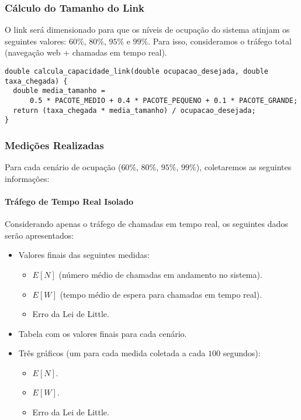 \subsubsection{Cálculo do Tamanho do Link}
O link será dimensionado para que os níveis de ocupação do sistema atinjam os seguintes valores: \(60\%\), \(80\%\), \(95\%\) e \(99\%\). Para isso, consideramos o tráfego total (navegação web + chamadas em tempo real). 
\begin{verbatim}
double calcula_capacidade_link(double ocupacao_desejada, double taxa_chegada) {
  double media_tamanho =
      0.5 * PACOTE_MEDIO + 0.4 * PACOTE_PEQUENO + 0.1 * PACOTE_GRANDE;
  return (taxa_chegada * media_tamanho) / ocupacao_desejada;
}
\end{verbatim}

\subsubsection{Medições Realizadas}

Para cada cenário de ocupação (\(60\%\), \(80\%\), \(95\%\), \(99\%\)), coletaremos as seguintes informações:

\paragraph{Tráfego de Tempo Real Isolado}

Considerando apenas o tráfego de chamadas em tempo real, os seguintes dados serão apresentados:
\begin{itemize}
    \item Valores finais das seguintes medidas:
    \begin{itemize}
        \item \(E[N]\) (número médio de chamadas em andamento no sistema).
        \item \(E[W]\) (tempo médio de espera para chamadas em tempo real).
        \item Erro da Lei de Little.
    \end{itemize}
    \item Tabela com os valores finais para cada cenário.
    \item Três gráficos (um para cada medida coletada a cada \(100\) segundos):
    \begin{itemize}
        \item \(E[N]\).
        \item \(E[W]\).
        \item Erro da Lei de Little.
    \end{itemize}
\end{itemize}

